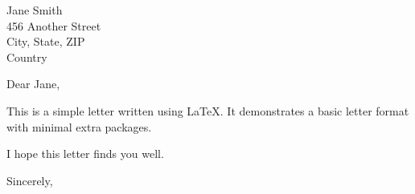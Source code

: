 \documentclass[a4paper,10pt]{letter}
\begin{document}
\begin{letter}{Jane Smith \\ 456 Another Street \\ City, State, ZIP \\ Country}

\opening{Dear Jane,}

This is a simple letter written using LaTeX. It demonstrates a basic letter format with minimal extra packages.

I hope this letter finds you well. 

\closing{Sincerely,}

\end{letter}
\end{document}
